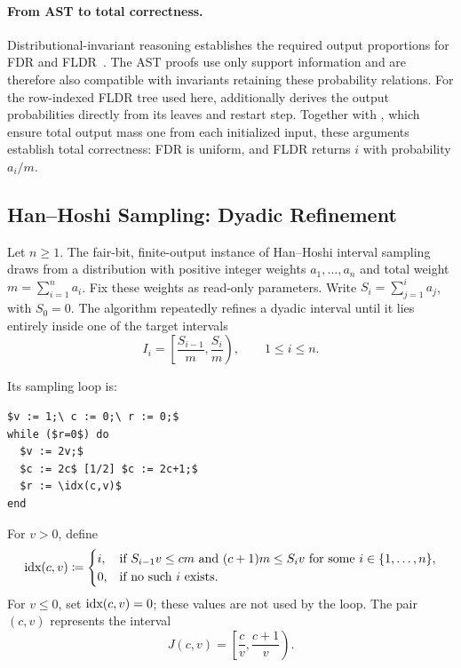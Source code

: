\paragraph{From AST to total correctness.}
Distributional-invariant reasoning establishes the required output
proportions for FDR and FLDR~\cite{zilken2026verifyingsamplingalgorithmsdistributional}.
The AST proofs use only support information and are therefore also
compatible with invariants retaining these probability relations.
For the row-indexed FLDR tree used here,  additionally
derives the output probabilities directly from its leaves and restart
step. Together with , which ensure total output
mass one from each initialized input, these arguments establish total
correctness: FDR is uniform, and FLDR returns $i$ with probability $a_i/m$.



\subsection{Han--Hoshi Sampling: Dyadic Refinement}
\label{sec:HanHoshi}

Let $n\geq1$. The fair-bit, finite-output instance of Han--Hoshi interval
sampling~\cite{HanHoshi1997} draws from a distribution with positive
integer weights $a_1,\ldots,a_n$ and total weight
$m=\sum_{i=1}^n a_i$. Fix these weights as read-only parameters.
Write $S_i=\sum_{j=1}^i a_j$, with $S_0=0$.
The algorithm repeatedly refines a dyadic interval until it lies entirely
inside one of the target intervals
\[
 I_i=\left[\frac{S_{i-1}}m,\frac{S_i}m\right),
 \qquad 1\le i\le n.
\]
\noindent\begin{minipage}{\linewidth}
Its sampling loop is:
\begin{lstlisting}[basicstyle=\ttfamily\small,mathescape=true,frame=single]
$v := 1;\ c := 0;\ r := 0;$
while ($r=0$) do
  $v := 2v;$
  $c := 2c$ [1/2] $c := 2c+1;$
  $r := \idx(c,v)$
end
\end{lstlisting}
\end{minipage}

For $v>0$, define
\[
 \textnormal{idx}(c,v)
 \coloneqq
 \begin{cases}
 i,
 & \text{if }S_{i-1}v\le cm\text{ and }(c+1)m\le S_iv
   \text{ for some }i\in\{1,\ldots,n\},\\
 0,&\text{if no such }i\text{ exists}.
 \end{cases}
\]
For $v\leq0$, set $\textnormal{idx}(c,v)=0$; these values are not used by the loop.
The pair $(c,v)$ represents the interval
\[
 J(c,v)=\left[\frac cv,\frac{c+1}v\right).
\]
